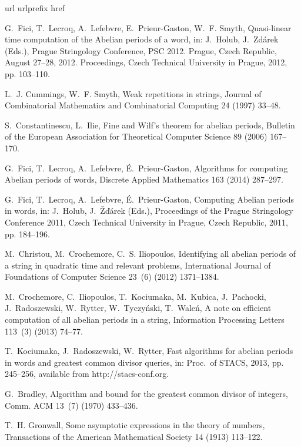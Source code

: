 \documentclass[3p]{elsarticle}
\begin{document}
\begin{thebibliography}{10}
\expandafter\ifx\csname url\endcsname\relax
  \def\url#1{\texttt{#1}}\fi
\expandafter\ifx\csname urlprefix\endcsname\relax\def\urlprefix{URL }\fi
\expandafter\ifx\csname href\endcsname\relax
  \def\href#1#2{#2} \def\path#1{#1}\fi

G.~Fici, T.~Lecroq, A.~Lefebvre, E.~Prieur-Gaston, W.~F. Smyth, Quasi-linear
  time computation of the {A}belian periods of a word, in: J.~Holub,
  J.~Zd{\'a}rek (Eds.), Prague Stringology Conference, {PSC} 2012. Prague,
  Czech Republic, August 27--28, 2012. Proceedings, Czech Technical University
  in Prague, 2012, pp. 103--110.

L.~J. Cummings, W.~F. Smyth, Weak repetitions in strings, {Journal of
  Combinatorial Mathematics and Combinatorial Computing} 24 (1997) 33--48.

S.~Constantinescu, L.~Ilie, {F}ine and {W}ilf's theorem for abelian periods,
  Bulletin of the European Association for Theoretical Computer Science 89
  (2006) 167--170.

G.~Fici, T.~Lecroq, A.~Lefebvre, {\'{E}}.~Prieur-Gaston, Algorithms for
  computing {A}belian periods of words, Discrete Applied Mathematics 163 (2014)
  287--297.

G.~Fici, T.~Lecroq, A.~Lefebvre, {\'{E}}.~Prieur-Gaston, Computing {A}belian
  periods in words, in: J.~Holub, J.~{\v{Z}}{\v{d}}{\'{a}}rek (Eds.),
  Proceedings of the Prague Stringology Conference 2011, Czech Technical
  University in Prague, Czech Republic, 2011, pp. 184--196.

M.~Christou, M.~Crochemore, C.~S. Iliopoulos, Identifying all abelian periods
  of a string in quadratic time and relevant problems, International Journal of
  Foundations of Computer Science 23~(6) (2012) 1371--1384.

M.~Crochemore, C.~Iliopoulos, T.~Kociumaka, M.~Kubica, J.~Pachocki,
  J.~Radoszewski, W.~Rytter, W.~Tyczy\'nski, T.~Wale\'n, A note on efficient
  computation of all abelian periods in a string, Information Processing
  Letters 113~(3) (2013) 74--77.

T.~Kociumaka, J.~Radoszewski, W.~Rytter, Fast algorithms for abelian periods in
  words and greatest common divisor queries, in: Proc.~of {STACS}, 2013, pp.
  245--256, available from http://stacs-conf.org.

G.~Bradley, Algorithm and bound for the greatest common divisor of 
  integers, Comm. ACM 13~(7) (1970) 433--436.

T.~H. Gronwall, Some asymptotic expressions in the theory of numbers,
  Transactions of the American Mathematical Society 14 (1913) 113--122.

\end{thebibliography}
\end{document}
